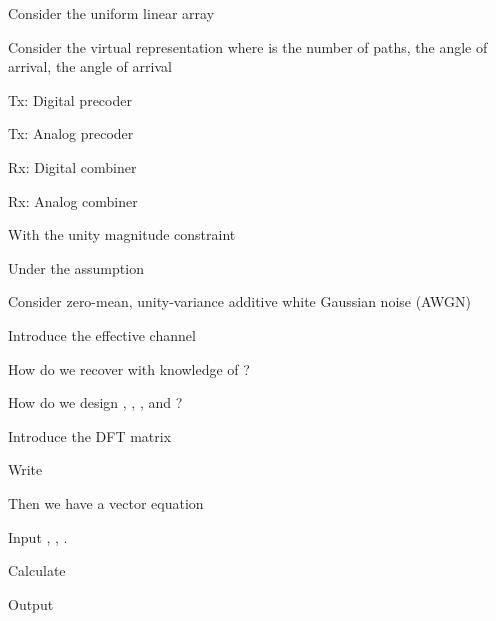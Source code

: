 {
\I Consider the uniform linear array

\I Consider the virtual representation
where  is the number of paths,  the angle of arrival,  the angle of arrival
}
{
\I Tx: Digital precoder 

\I Tx: Analog precoder 

\I Rx: Digital combiner 

\I Rx: Analog combiner 

\I With the unity magnitude constraint

\I Under the assumption 
}
{
\I Consider zero-mean, unity-variance additive white Gaussian noise (AWGN) 

\I Introduce the effective channel

\I How do we recover  with knowledge of ?

\I How do we design , , , and ?
}
{
\I Introduce the DFT matrix 

\I Write

\I Then we have a vector equation
}
{
\I Input , , .

\I Calculate

\I Output 
}


